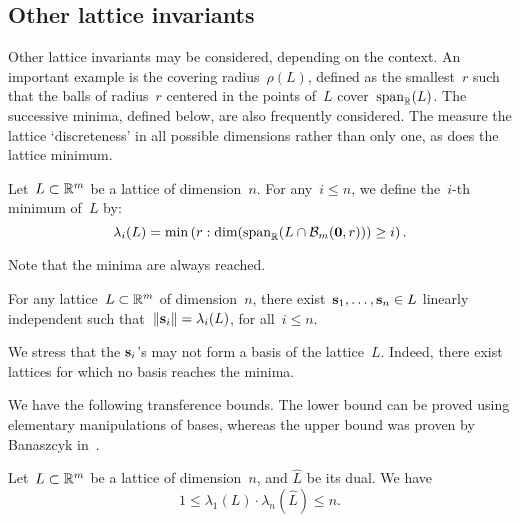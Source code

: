 \begin{comment}
r^{m} (2pie/m)^(m/2) (1+sqrt(m/2)/r)^m q^(n-m) \leq 2^(-m)
r +sqrt(m/2) <= q^(1-n/m) * sqrt(m/8pie)
\end{comment}

\subsection{Other lattice invariants}

Other lattice invariants may be considered, depending on the context. An important example is the covering radius~$\rho(L)$, 
defined as the smallest~$r$ such that the balls of radius~$r$ centered in the points of~$L$ cover~$\mbox{span}_{\mathbb{R}}(L)$.
The successive minima, defined below, are also frequently considered. The measure the lattice `discreteness' in all possible dimensions
rather than only one, as does the lattice minimum. 

\begin{definition}
Let~$L \subset \mathbb{R}^m$ be a lattice of dimension~$n$. For any~$i \leq n$, we define the~$i$-th minimum of~$L$ by:
\[
\lambda_i(L) = \min \left( r: \dim(\mbox{span}_{\mathbb{R}}( L \cap \mathcal{B}_m ({\bf 0}, r))) \geq i \right). 
\]
\end{definition}

Note that the minima are always reached. 

\begin{lemma}
For any lattice~$L \subset \mathbb{R}^m$ of dimension~$n$, there exist~${\bf s}_1, \ldots, {\bf s}_n \in L$ linearly independent such that~$\|{\bf s}_i\| = \lambda_i(L)$, for all~$i \leq n$. 
\end{lemma}

We stress that the ${\bf s}_i$'s may not form a basis of the lattice~$L$. Indeed, there exist lattices for which no basis reaches 
the minima. 

We have the following transference bounds. The lower bound can be proved using elementary manipulations of bases, 
whereas the upper bound was proven by Banaszcyk in~\cite{Bana93}. 

\begin{theorem}
Let~$L \subset \mathbb{R}^m$ be a lattice of dimension~$n$, and $\widehat{L}$ be its dual. We have
\[ 
1 \leq \lambda_1(L) \cdot  \lambda_n(\widehat{L}) \leq n. 
\]
\end{theorem}

%
%


